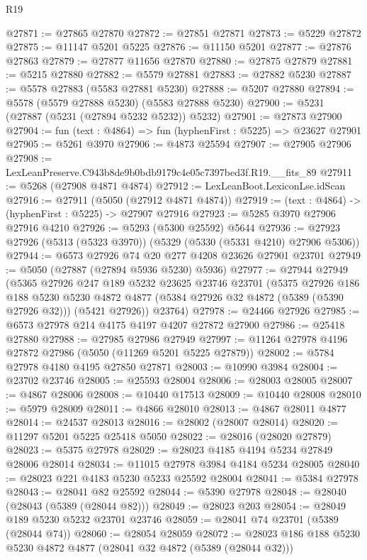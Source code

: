 \begin{lexlean}{R19}
\begin{coremodule}
@27871 := @27865 @27870
@27872 := @27851 @27871
@27873 := @5229 @27872
@27875 := @11147 @5201 @5225
@27876 := @11150 @5201
@27877 := @27876 @27863
@27879 := @27877 @11656 @27870
@27880 := @27875 @27879
@27881 := @5215 @27880
@27882 := @5579 @27881
@27883 := @27882 @5230
@27887 := @5578 @27883 (@5583 @27881 @5230)
@27888 := @5207 @27880
@27894 := @5578 (@5579 @27888 @5230) (@5583 @27888 @5230)
@27900 := @5231 (@27887 (@5231 (@27894 @5232 @5232)) @5232)
@27901 := @27873 @27900
@27904 := fun (text : @4864) => fun (hyphenFirst : @5225) => @23627 @27901
@27905 := @5261 @3970
@27906 := @4873 @25594
@27907 := @27905 @27906
@27908 := LexLeanPreserve.C943b8de9b0bdb9179c4e05c7397bed3f.R19.__fits_89
@27911 := @5268 (@27908 @4871 @4874)
@27912 := LexLeanBoot.LexiconLse.idScan
@27916 := @27911 (@5050 (@27912 @4871 @4874))
@27919 := (text : @4864) -> (hyphenFirst : @5225) -> @27907 @27916
@27923 := @5285 @3970 @27906 @27916 @4210
@27926 := @5293 (@5300 @25592) @5644
@27936 := @27923 @27926 (@5313 (@5323 @3970)) (@5329 (@5330 (@5331 @4210) @27906 @5306))
@27944 := @6573 @27926 @74 @20 @277 @4208 @23626 @27901 @23701
@27949 := @5050 (@27887 (@27894 @5936 @5230) @5936)
@27977 := @27944
    @27949
    (@5365
      @27926
      @247
      @189
      @5232
      @23625
      @23746
      @23701
      (@5375
        @27926
        @186
        @188
        @5230
        @5230
        @4872
        @4877
        (@5384 @27926 @32 @4872 (@5389 (@5390 @27926 @32)))
        (@5421 @27926))
      @23764)
@27978 := @24466 @27926
@27985 := @6573 @27978 @214 @4175 @4197 @4207 @27872 @27900
@27986 := @25418 @27880
@27988 := @27985 @27986 @27949
@27997 := @11264 @27978 @4196 @27872 @27986 (@5050 (@11269 @5201 @5225 @27879))
@28002 := @5784 @27978 @4180 @4195 @27850 @27871
@28003 := @10990 @3984
@28004 := @23702 @23746
@28005 := @25593 @28004
@28006 := @28003 @28005
@28007 := @4867 @28006
@28008 := @10440 @17513
@28009 := @10440 @28008
@28010 := @5979 @28009
@28011 := @4866 @28010
@28013 := @4867 @28011 @4877
@28014 := @24537 @28013
@28016 := @28002 (@28007 @28014)
@28020 := @11297 @5201 @5225 @25418 @5050
@28022 := @28016 (@28020 @27879)
@28023 := @5375 @27978
@28029 := @28023 @4185 @4194 @5234 @27849 @28006 @28014
@28034 := @11015 @27978 @3984 @4184 @5234 @28005
@28040 := @28023 @221 @4183 @5230 @5233 @25592 @28004
@28041 := @5384 @27978
@28043 := @28041 @82 @25592
@28044 := @5390 @27978
@28048 := @28040 (@28043 (@5389 (@28044 @82)))
@28049 := @28023 @203
@28054 := @28049 @189 @5230 @5232 @23701 @23746
@28059 := @28041 @74 @23701 (@5389 (@28044 @74))
@28060 := @28054 @28059
@28072 := @28023 @186 @188 @5230 @5230 @4872 @4877 (@28041 @32 @4872 (@5389 (@28044 @32)))

\end{coremodule}
\end{lexlean}
